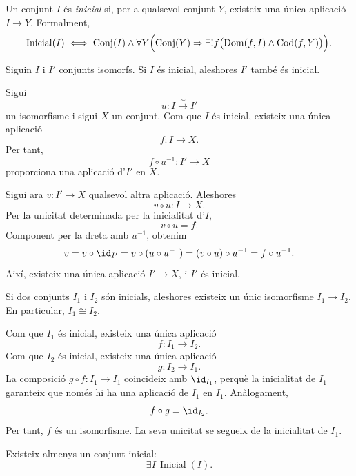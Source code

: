 \begin{definicio}\label{def:inicial}
Un conjunt \(I\) és \emph{inicial} si, per a qualsevol conjunt \(Y\), existeix una única aplicació \(I\to Y\). Formalment,
\[
\operatorname{Inicial}(I)
\iff
\operatorname{Conj}(I)\land
\forall Y\Bigl(
  \operatorname{Conj}(Y)\Rightarrow
  \exists!f\bigl(\operatorname{Dom}(f,I)\land \operatorname{Cod}(f,Y)\bigr)
\Bigr).
\]
\end{definicio}

\begin{proposicio}
\label{prop:invariancia-inicialitat}
Siguin \(I\) i \(I'\) conjunts isomorfs. Si \(I\) és inicial,
aleshores \(I'\) també és inicial.
\end{proposicio}

\begin{prova}
Sigui
\[
u:I\xrightarrow{\sim}I'
\]
un isomorfisme i sigui \(X\) un conjunt. Com que \(I\) és
inicial, existeix una única aplicació
\[
f:I\to X.
\]
Per tant,
\[
f\circ u^{-1}:I'\to X
\]
proporciona una aplicació d'\(I'\) en \(X\).

Sigui ara \(v:I'\to X\) qualsevol altra aplicació. Aleshores
\[
v\circ u:I\to X.
\]
Per la unicitat determinada per la inicialitat d'\(I\),
\[
v\circ u=f.
\]
Component per la dreta amb \(u^{-1}\), obtenim
\[
v
=v\circ\id_{I'}
=v\circ(u\circ u^{-1})
=(v\circ u)\circ u^{-1}
=f\circ u^{-1}.
\]
Així, existeix una única aplicació \(I'\to X\), i \(I'\) és
inicial.
\end{prova}

\begin{proposicio}\label{prop:inicial-unic}
Si dos conjunts \(I_1\) i \(I_2\) són inicials, aleshores existeix un únic isomorfisme \(I_1\to I_2\). En particular, \(I_1\cong I_2\).
\end{proposicio}

\begin{prova}
Com que \(I_1\) és inicial, existeix una única aplicació
\[
f:I_1\to I_2.
\]
Com que \(I_2\) és inicial, existeix una única aplicació
\[
g:I_2\to I_1.
\]
La composició \(g\circ f:I_1\to I_1\) coincideix amb \(\id_{I_1}\), perquè la inicialitat de \(I_1\) garanteix que només hi ha una aplicació de \(I_1\) en \(I_1\). Anàlogament,
\[
f\circ g=\id_{I_2}.
\]
Per tant, \(f\) és un isomorfisme. La seva unicitat se segueix de la inicialitat de \(I_1\).
\end{prova}

\begin{axioma}\label{ax:inicial-existencia}
Existeix almenys un conjunt inicial:
\[
\exists I\,\operatorname{Inicial}(I).
\]
\end{axioma}

